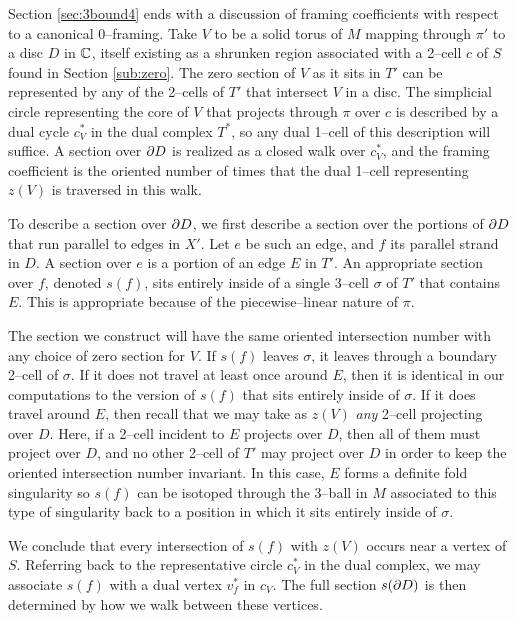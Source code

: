 Section \ref{sec:3bound4} ends with a discussion of framing coefficients with respect to a canonical 0--framing.
Take $V$ to be a solid torus of $M$ mapping through $\pi'$ to a disc $D$ in $\mathbb{C}$, itself existing as a shrunken region associated with a 2--cell $c$ of $S$ found in Section \ref{sub:zero}.
The zero section of $V$ as it sits in $T'$ can be represented by any of the 2--cells of $T'$ that intersect $V$ in a disc.
The simplicial circle representing the core of $V$ that projects through $\pi$ over $c$ is described by a dual cycle $c_V^*$ in the dual complex $T^*$, so any dual 1--cell of this description will suffice.
A section over $\partial D$ is realized as a closed walk over $c_V^*$, and the framing coefficient is the oriented number of times that the dual 1--cell representing $z(V)$ is traversed in this walk.

To describe a section over $\partial D$, we first describe a section over the portions of $\partial D$ that run parallel to edges in $X'$.
Let $e$ be such an edge, and $f$ its parallel strand in $D$.
A section over $e$ is a portion of an edge $E$ in $T'$.
An appropriate section over $f$, denoted $s(f)$, sits entirely inside of a single 3--cell $\sigma$ of $T'$ that contains $E$.
This is appropriate because of the piecewise--linear nature of $\pi$.

The section we construct will have the same oriented intersection number with any choice of zero section for $V$.
If $s(f)$ leaves $\sigma$, it leaves through a boundary 2--cell of $\sigma$.
If it does not travel at least once around $E$, then it is identical in our computations to the version of $s(f)$ that sits entirely inside of $\sigma$.
If it does travel around $E$, then recall that we may take as $z(V)$ \emph{any} 2--cell projecting over $D$.
Here, if a 2--cell incident to $E$ projects over $D$, then all of them must project over $D$, and no other 2--cell of $T'$ may project over $D$ in order to keep the oriented intersection number invariant.
In this case, $E$ forms a definite fold singularity so $s(f)$ can be isotoped through the 3--ball in $M$ associated to this type of singularity back to a position in which it sits entirely inside of $\sigma$.

We conclude that every intersection of $s(f)$ with $z(V)$ occurs near a vertex of $S$.
Referring back to the representative circle $c_V^*$ in the dual complex, we may associate $s(f)$ with a dual vertex $v_f^*$ in $c_V$.
The full section $s(\partial D)$ is then determined by how we walk between these vertices.

